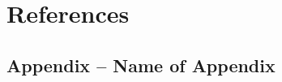 \documentclass[a4paper, 12pt]{article}
\begin{document}
    \section{References}
        \label{sec:references}
        \ifx{}
            \setcounter{biburllcpenalty}{9000}
            \setcounter{biburlucpenalty}{9000}
            \printbibliography[heading=none]
        \fi
\clearpage
    \begin{appendices}
        \renewcommand{\theequation}{\Alph{section}.\arabic{equation}}
        \setcounter{equation}{0}
        \renewcommand{\thefigure}{\Alph{section}.\arabic{figure}}
        \setcounter{figure}{0}
        \renewcommand{\thetable}{\Alph{section}.\arabic{table}}
        \setcounter{table}{0}
        \ifx{}
            \renewcommand{\thelisting}{\Alph{section}.\arabic{listing}}
            \setcounter{listing}{0}
        \fi
        \section{Appendix -- Name of Appendix}
            \label{sec:appndixname}
    \end{appendices}
\end{document}
